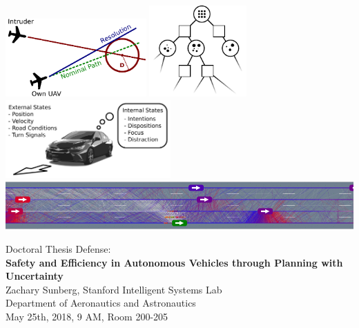 \documentclass[11pt, letterpaper, oneside, extrafontsizes]{memoir}
\begin{document}
\begin{center}
    \hspace*{\fill}
    \includegraphics[height=3cm]{../media/simple_trl.pdf}
    \hfill{}
    \includegraphics[height=3.5cm]{../media/pomcpow_tree.pdf}
    \hspace*{\fill}
    \\

    \vspace{0.5cm}
    \includegraphics[height=3cm]{../media/states.pdf}\\

    \vspace{0.5cm}
    \includegraphics[width=0.8\linewidth]{../media/cropped_julia18MVWL.png}

    \vspace{1cm}

    Doctoral Thesis Defense:\\
    \vspace{10pt}
    \textbf{\LARGE Safety and Efficiency in Autonomous Vehicles through Planning with Uncertainty}\\
    \vspace{10pt}
    Zachary Sunberg, Stanford Intelligent Systems Lab\\
    Department of Aeronautics and Astronautics\\
    May 25th, 2018, 9 AM, Room 200-205
\end{center}
\end{document}

